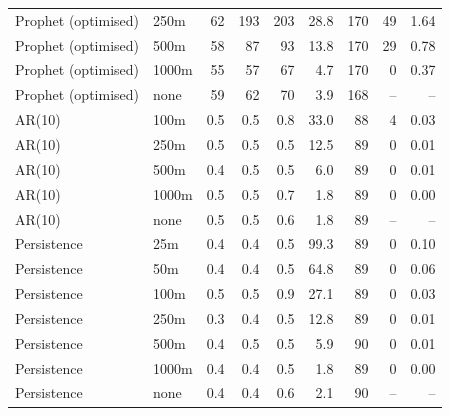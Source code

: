 \begin{tabular}{llrrrrrrr}
Prophet (optimised) & 250m & 62 & 193 & 203 & 28.8 & 170 & 49 & 1.64 \\
Prophet (optimised) & 500m & 58 & 87 & 93 & 13.8 & 170 & 29 & 0.78 \\
Prophet (optimised) & 1000m & 55 & 57 & 67 & 4.7 & 170 & 0 & 0.37 \\
Prophet (optimised) & none & 59 & 62 & 70 & 3.9 & 168 & -- & -- \\
AR(10) & 100m & 0.5 & 0.5 & 0.8 & 33.0 & 88 & 4 & 0.03 \\
AR(10) & 250m & 0.5 & 0.5 & 0.5 & 12.5 & 89 & 0 & 0.01 \\
AR(10) & 500m & 0.4 & 0.5 & 0.5 & 6.0 & 89 & 0 & 0.01 \\
AR(10) & 1000m & 0.5 & 0.5 & 0.7 & 1.8 & 89 & 0 & 0.00 \\
AR(10) & none & 0.5 & 0.5 & 0.6 & 1.8 & 89 & -- & -- \\
Persistence & 25m & 0.4 & 0.4 & 0.5 & 99.3 & 89 & 0 & 0.10 \\
Persistence & 50m & 0.4 & 0.4 & 0.5 & 64.8 & 89 & 0 & 0.06 \\
Persistence & 100m & 0.5 & 0.5 & 0.9 & 27.1 & 89 & 0 & 0.03 \\
Persistence & 250m & 0.3 & 0.4 & 0.5 & 12.8 & 89 & 0 & 0.01 \\
Persistence & 500m & 0.4 & 0.5 & 0.5 & 5.9 & 90 & 0 & 0.01 \\
Persistence & 1000m & 0.4 & 0.4 & 0.5 & 1.8 & 89 & 0 & 0.00 \\
Persistence & none & 0.4 & 0.4 & 0.6 & 2.1 & 90 & -- & -- \\
\bottomrule
\end{tabular}
